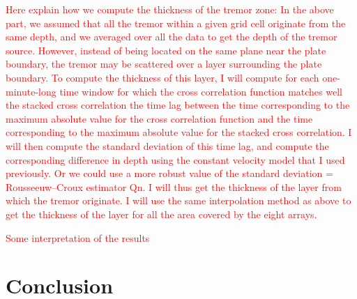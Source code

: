 \documentclass[draft]{agujournal2019}
\begin{document}
\textcolor{red}{Here explain how we compute the thickness of the tremor zone: In the above part, we assumed that all the tremor within a given grid cell originate from the same depth, and we averaged over all the data to get the depth of the tremor source. However, instead of being located on the same plane near the plate boundary, the tremor may be scattered over a layer surrounding the plate boundary. To compute the thickness of this layer, I will compute for each one-minute-long time window for which the cross correlation function matches well the stacked cross correlation the time lag between the time corresponding to the maximum absolute value for the cross correlation function and the time corresponding to the maximum absolute value for the stacked cross correlation. I will then compute the standard deviation of this time lag, and compute the corresponding difference in depth using the constant velocity model that I used previously. Or we could use a more robust value of the standard deviation = Rousseeuw–Croux estimator Qn.
I will thus get the thickness of the layer from which the tremor originate. I will use the same interpolation method as above to get the thickness of the layer for all the area covered by the eight arrays.
}

\textcolor{red}{Some interpretation of the results}

\section{Conclusion}


\end{document}
